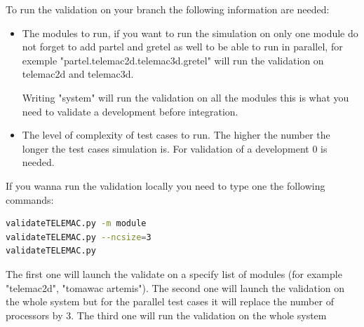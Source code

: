 %
To run the validation on your branch the following information are needed:
\begin{itemize}
\item The modules to run, if you want to run the simulation on only one module
do not forget to add partel and gretel as well to be able to run in parallel,
for exemple "partel.telemac2d.telemac3d.gretel" will run the validation on
telemac2d and telemac3d.

Writing "system" will run the validation on all the modules this is what you
need to validate a development before integration.
\item The level of complexity of test cases to run. The higher the number the
longer the test cases simulation is. For validation of a development 0 is
needed.
\end{itemize} 

If you wanna run the validation locally you need to type one the following commands:
\begin{lstlisting}[language=bash]
validateTELEMAC.py -m module
validateTELEMAC.py --ncsize=3
validateTELEMAC.py
\end{lstlisting}
The first one will launch the validate on a specify list of modules (for example
"telemac2d", "tomawac artemis").
The second one will launch the validation on the whole system but for the
parallel test cases it will replace the number of processors by 3.
The third one will run the validation on the whole system
%
%
